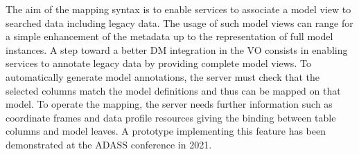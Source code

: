 The aim of the mapping syntax is to enable services to associate a model view to searched data including legacy data.
The usage of such model views can range for a simple enhancement of the metadata up to the representation of full model instances.
A step toward a better DM integration in the VO consists in enabling services to annotate
legacy data by providing complete model
views. 
To automatically generate model annotations, the server must check that the selected columns 
match the model definitions and thus can be
mapped on that model. To operate the mapping, the server needs further information
such as coordinate frames and data profile resources giving the binding between table
columns and model leaves. A prototype \citep{2201.01732} implementing this feature
has been demonstrated at the ADASS conference in 2021.

